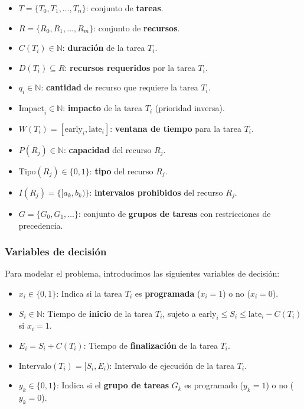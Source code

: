 \documentclass{article}
\begin{document}
\begin{tcolorbox}[colback=gray!5!white, colframe=gray!75!black, title={Parámetros del modelo}]
    \begin{itemize}
        \item \( T = \{T_0, T_1, \dots, T_n\} \): conjunto de \textbf{tareas}.
        \item \( R = \{R_0, R_1, \dots, R_m\} \): conjunto de \textbf{recursos}.
        \item \( C(T_i) \in \mathbb{N} \): \textbf{duración} de la tarea \( T_i \).
        \item \( D(T_i) \subseteq R \): \textbf{recursos requeridos} por la tarea \( T_i \).
        \item \( q_i \in \mathbb{N} \): \textbf{cantidad} de recurso que requiere la tarea \( T_i \).
        \item \( \text{Impact}_i \in \mathbb{N} \): \textbf{impacto} de la tarea \( T_i \) (prioridad inversa).
        \item \( W(T_i) = [\text{early}_i, \text{late}_i] \): \textbf{ventana de tiempo} para la tarea \( T_i \).
        \item \( P(R_j) \in \mathbb{N} \): \textbf{capacidad} del recurso \( R_j \).
        \item \( \text{Tipo}(R_j) \in \{0, 1\} \): \textbf{tipo} del recurso \( R_j \).
        \item \( I(R_j) = \{[a_k, b_k)\} \): \textbf{intervalos prohibidos} del recurso \( R_j \).
        \item \( G = \{G_0, G_1, \dots\} \): conjunto de \textbf{grupos de tareas} con restricciones de precedencia.
    \end{itemize}
\end{tcolorbox}

\vspace{0.5cm}

\subsubsection{Variables de decisión}

Para modelar el problema, introducimos las siguientes variables de decisión:

\begin{itemize}
    \item \( x_i \in \{0, 1\} \): Indica si la tarea \( T_i \) es \textbf{programada} (\( x_i = 1 \)) o no (\( x_i = 0 \)).
    \item \( S_i \in \mathbb{N} \): Tiempo de \textbf{inicio} de la tarea \( T_i \), sujeto a \( \text{early}_i \leq S_i \leq \text{late}_i - C(T_i) \) si \( x_i = 1 \).
    \item \( E_i = S_i + C(T_i) \): Tiempo de \textbf{finalización} de la tarea \( T_i \).
    \item \( \text{Intervalo}(T_i) = [S_i, E_i) \): Intervalo de ejecución de la tarea \( T_i \).
    \item \( y_k \in \{0, 1\} \): Indica si el \textbf{grupo de tareas} \( G_k \) es programado (\( y_k = 1 \)) o no (\( y_k = 0 \)).
\end{itemize}
\end{document}

